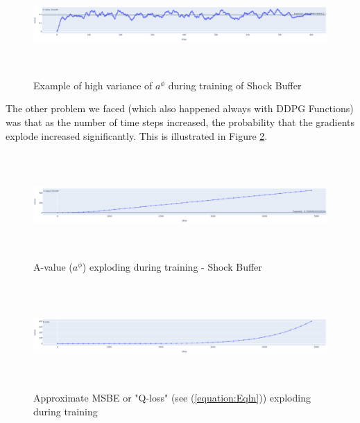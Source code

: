 \begin{figure}[htpb]
\centering
  \includegraphics[width=1\textwidth,height=4cm]{figures/DDPGSBVariance.png}
  \caption[High variance Shock Buffer]{Example of high variance of $a^\phi$ during training of Shock Buffer} \label{fig:sbvariance}
\end{figure}

The other problem we faced (which also happened always with DDPG Functions) was that as the number of time steps increased, the probability that the gradients explode increased significantly. This is illustrated in Figure \ref{fig:expasb}.


\begin{figure}[htpb]
\centering
  \includegraphics[width=1\textwidth,height=4cm]{figures/SBExplA.png}
  \caption[Exploding A values - Shock Buffer]{A-value ($a^\phi$)  exploding during training - Shock Buffer } \label{fig:expasb}
\end{figure}
\begin{figure}[htpb]
\centering
  \includegraphics[width=1\textwidth,height=4cm]{figures/SBExplQ.png}
  \caption[Exploding Q loss - Shock Buffer]{Approximate MSBE or "Q-loss" (see (\ref{equation:Eqln})) exploding during training } \label{fig:expqlosssb}
\end{figure}

